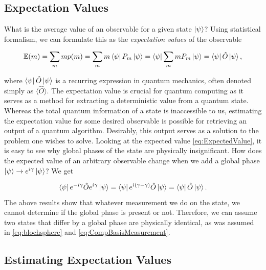 \subsection{Expectation Values}\label{sec:ExpectationValues}

What is the average value of an observable for a given state $\ket{\psi}$? Using statistical formalism, we can formulate this as the \emph{expectation values} of the observable

\begin{equation}\label{eq:ExpectedValue}
    \mathbb{E}(m) = \sum_m m p(m) = \sum_m m \bra{\psi}P_m\ket{\psi} = \bra{\psi}\sum_m m P_m\ket{\psi} = \bra{\psi}\hat{O}\ket{\psi},
\end{equation}

where $\bra{\psi}\hat{O}\ket{\psi}$ is a recurring expression in quantum mechanics, often denoted simply as $\langle \hat{O} \rangle$. The expectation value is crucial for quantum computing as it serves as a method for extracting a deterministic value from a quantum state. Whereas the total quantum information of a state is inaccessible to us, estimating the expectation value for some desired observable is possible for retrieving an output of a quantum algorithm. Desirably, this output serves as a solution to the problem one wishes to solve. Looking at the expected value \cref{eq:ExpectedValue}, it is easy to see why global phases of the state are physically insignificant. How does the expected value of an arbitrary observable change when we add a global phase $\ket{\psi} \rightarrow e^{i\gamma}\ket{\psi}$? We get

\begin{equation}\label{eq:ExpectedValue}
    \bra{\psi}e^{-i\gamma}
    \hat{O}e^{i\gamma}\ket{\psi} =\bra{\psi}e^{i(\gamma-\gamma) }\hat{O}\ket{\psi} = 
    \bra{\psi}\hat{O}\ket{\psi}.
\end{equation}
The above results show that whatever measurement we do on the state, we cannot determine if the global phase is present or not. Therefore, we can assume two states that differ by a global phase are physically identical, as was assumed in \cref{eq:blochsphere} and \cref{eq:CompBasisMeasurement}.

\subsection{Estimating Expectation Values}\label{sec:EstimatingExpectationValues}

